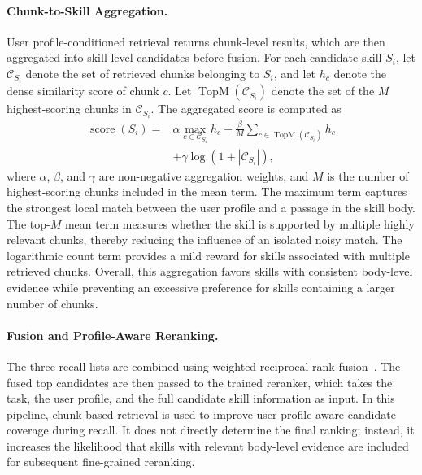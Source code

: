 \documentclass[letterpaper]{article} %
\begin{document}
\paragraph{Chunk-to-Skill Aggregation.}
User profile-conditioned retrieval returns chunk-level results, which are then aggregated into skill-level candidates before fusion.
For each candidate skill $S_i$, let $\mathcal{C}_{S_i}$ denote the set of
retrieved chunks belonging to $S_i$, and let $h_c$ denote the dense similarity
score of chunk $c$.
Let $\operatorname{TopM}(\mathcal{C}_{S_i})$ denote the set of the $M$
highest-scoring chunks in $\mathcal{C}_{S_i}$. The aggregated score is
computed as
\begin{equation}
\begin{aligned}
\operatorname{score}(S_i)
={}&
\alpha
\max_{c\in\mathcal{C}_{S_i}} h_c
+
\frac{\beta}{M}
\sum_{c\in\operatorname{TopM}(\mathcal{C}_{S_i})} h_c \\
&+
\gamma
\log\!\left(1+\left|\mathcal{C}_{S_i}\right|\right),
\end{aligned}
\label{eq:chunk_to_skill_aggregation}
\end{equation}
where $\alpha$, $\beta$, and $\gamma$ are non-negative aggregation weights,
and $M$ is the number of highest-scoring chunks included in the mean
term. The maximum term captures the strongest local match between the user profile and a passage in the skill body. 
The top-$M$ mean term measures whether the skill is supported by multiple highly relevant chunks, thereby reducing the influence of an isolated noisy match. 
The logarithmic count term provides a mild reward for skills associated with multiple retrieved chunks.
Overall, this aggregation favors skills with consistent body-level evidence while preventing an excessive preference for skills containing a larger
number of chunks.

\paragraph{Fusion and Profile-Aware Reranking.}
The three recall lists are combined using weighted reciprocal rank fusion~\citep{cormack2009rrf}.
The fused top candidates are then passed to the trained reranker, which takes the task, the user profile, and the full candidate skill information as input.
In this pipeline, chunk-based retrieval is used to improve user profile-aware candidate coverage during recall.
It does not directly determine the final ranking; instead, it increases the likelihood that skills with relevant body-level evidence are included for subsequent fine-grained reranking.
\end{document}
